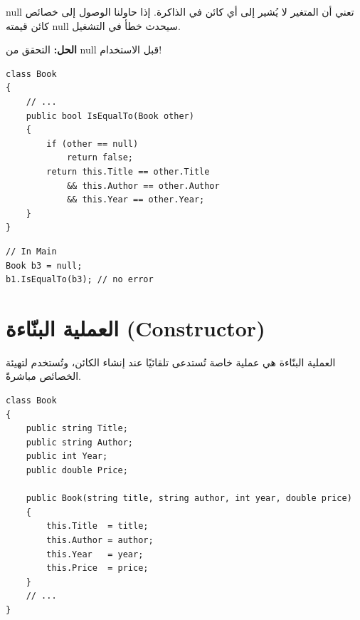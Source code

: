 \documentclass[14pt]{extarticle}
\begin{document}
\textenglish{null} تعني أن المتغير لا يُشير إلى أي كائن في الذاكرة. إذا حاولنا الوصول إلى خصائص كائن قيمته \textenglish{null} سيحدث خطأ في التشغيل.

\begin{boxAttention}
\textbf{الحل:} التحقق من \textenglish{null} قبل الاستخدام!
\end{boxAttention}

\begin{boxExample}
\begin{english}
\begin{verbatim}
class Book
{
    // ...
    public bool IsEqualTo(Book other)
    {
        if (other == null)
            return false;
        return this.Title == other.Title
            && this.Author == other.Author
            && this.Year == other.Year;
    }
}
\end{verbatim}
\end{english}
\end{boxExample}

\begin{boxExample}
\begin{english}
\begin{verbatim}
// In Main
Book b3 = null;
b1.IsEqualTo(b3); // no error
\end{verbatim}
\end{english}
\end{boxExample}

\clearpage
\section{العملية البنّاءة (\textenglish{Constructor})}

العملية البنّاءة هي عملية خاصة تُستدعى تلقائيًا عند إنشاء الكائن، وتُستخدم لتهيئة الخصائص مباشرةً.

\begin{boxExample}
\begin{english}
\begin{verbatim}
class Book
{
    public string Title;
    public string Author;
    public int Year;
    public double Price;

    public Book(string title, string author, int year, double price)
    {
        this.Title  = title;
        this.Author = author;
        this.Year   = year;
        this.Price  = price;
    }
    // ...
}
\end{verbatim}
\end{english}
\end{boxExample}
\end{document}
